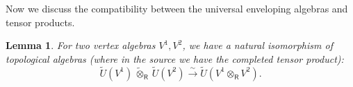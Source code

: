 \documentclass{amsart}
\newtheorem{Lem}[Thm]{Lemma}
\theoremstyle{definition}
\newcommand{\Ring}{\mathsf{R}}
\numberwithin{equation}{section}
\begin{document}
\subsubsection{} Now we discuss the compatibility between the universal enveloping algebras and tensor products. 
\begin{Lem}\label{Lem:univ_env_tensor}
For two vertex algebras $V^1,V^2$, we have a natural isomorphism of topological algebras (where in the source we have the completed tensor product):
$$\widetilde{U}(V^1)\, \widetilde{\otimes}_{\Ring} \,\widetilde{U}(V^2) 
\xrightarrow{\sim} \widetilde{U}(V^1
\otimes_{\Ring} V^2).$$
\end{Lem}
\end{document}
